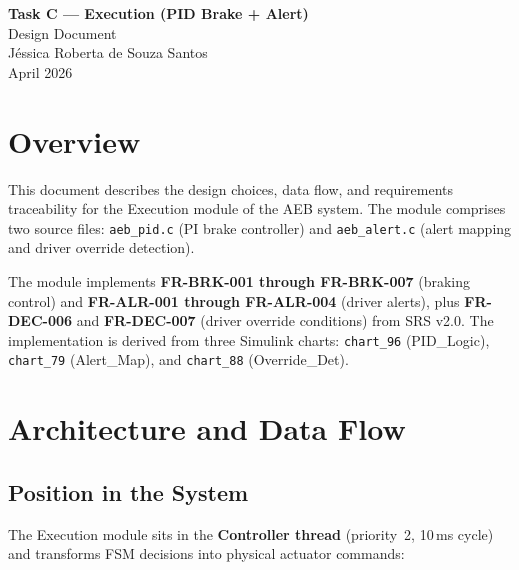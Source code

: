 \documentclass[12pt]{article}
\begin{document}
\begin{center}
{\LARGE\bfseries\color{stellantis} Task C --- Execution (PID Brake + Alert)}\\[6pt]
{\large Design Document}\\[10pt]
{\normalsize J\'essica Roberta de Souza Santos}\\
{\small April 2026}
\end{center}

\vspace{0.5cm}

\section{Overview}

This document describes the design choices, data flow, and requirements traceability for the Execution module of the AEB system. The module comprises two source files: \texttt{aeb\_pid.c} (PI brake controller) and \texttt{aeb\_alert.c} (alert mapping and driver override detection).

The module implements \textbf{FR-BRK-001 through FR-BRK-007} (braking control) and \textbf{FR-ALR-001 through FR-ALR-004} (driver alerts), plus \textbf{FR-DEC-006} and \textbf{FR-DEC-007} (driver override conditions) from SRS v2.0. The implementation is derived from three Simulink charts: \texttt{chart\_96} (PID\_Logic), \texttt{chart\_79} (Alert\_Map), and \texttt{chart\_88} (Override\_Det).

\section{Architecture and Data Flow}

\subsection{Position in the System}

The Execution module sits in the \textbf{Controller thread} (priority~2, 10\,ms cycle) and transforms FSM decisions into physical actuator commands:
\end{document}
